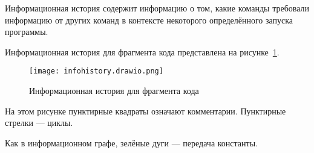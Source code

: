 Информационная история содержит информацию о том, какие команды требовали информацию от других команд в контексте некоторого определённого запуска программы.

Информационная история для фрагмента кода представлена на рисунке~\ref{fig:infohistory}.

\begin{figure}[h!]
  \texttt{[image: infohistory.drawio.png]}
  \caption{Информационная история для фрагмента кода}
  \label{fig:infohistory}
\end{figure}

На этом рисунке пунктирные квадраты означают комментарии. Пунктирные стрелки --- циклы.

Как в информационном графе, зелёные дуги --- передача константы.